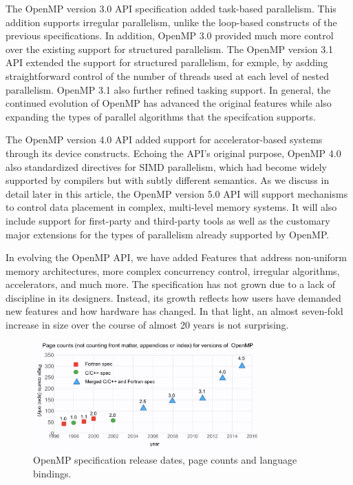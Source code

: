The OpenMP version 3.0 API specification added task-based parallelism.
This addition supports irregular parallelism, unlike the loop-based
constructs of the previous specifications. In addition, OpenMP 3.0
provided much more control over the existing support for structured
parallelism. The OpenMP version 3.1 API extended the support for 
structured parallelism, for exmple, by asdding straightforward control
of the number of threads used at each level of nested parallelism. 
OpenMP 3.1 also further refined tasking support. In general, the 
continued evolution of OpenMP has advanced the original features 
while also expanding the types of parallel algorithms that the 
specifcation supports.

The OpenMP version 4.0 API added support for accelerator-based systems
through its device constructs. Echoing the API's original purpose, 
OpenMP 4.0 also standardized directives for SIMD parallelism, which 
had become widely supported by compilers but with subtly different 
semantics. As we discuss in detail later in this article, the OpenMP
version 5.0 API will support mechanisms to control data placement in
complex, multi-level memory systems. It will also include support for
first-party and third-party tools as well as the customary major 
extensions for the types of parallelism already supported by OpenMP.

In evolving the OpenMP API, we have added Features that address 
non-uniform memory architectures, more complex concurrency control, 
irregular algorithms, accelerators, and much more. The specification 
has not grown due to a lack of discipline in its designers. Instead,
its growth reflects how users have demanded new features and how
hardware has changed. In that light, an almost seven-fold increase 
in size over the course of almost 20 years is not surprising.

\begin{figure}
  \centering
  \includegraphics[width=3.4in]{pics/opcounts.png}
  \caption{OpenMP specification release dates, page counts and language bindings.}
  \label{omppcount}
\end{figure}


